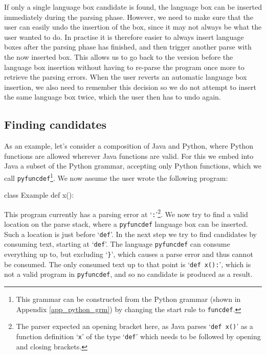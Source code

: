 \documentclass[sigplan,screen]{acmart}\settopmatter{printfolios=true,printccs=false,printacmref=false}
\newcommand{\qtt}[1]{`\texttt{#1}'\xspace}
\begin{document}
If only a single language box candidate is found, the language box
can be inserted immediately during the parsing phase. However, we need to make
sure that the user can easily undo the insertion of the box, since it may not
always be what the user wanted to do. In practise it is therefore easier to
always insert language boxes after the parsing phase has finished, and then trigger
another parse with the now inserted box. This allows us to go
back to the version before the language box insertion without having to re-parse
the program once more to retrieve the parsing errors.
When the user reverts an automatic language box insertion, we also need to remember
this decision so we do not attempt to insert the same language box twice, which the
user then has to undo again.

\subsection{Finding candidates}

As an example, let's consider a composition of Java and Python, where Python
functions are allowed wherever Java functions are valid. For this we embed into
Java a subset of the Python grammar, accepting only Python functions, which we
call \texttt{pyfuncdef}\footnote{This grammar can be constructed from the
Python grammar (shown in Appendix \ref{app_python_grm}) by changing the start
rule to \texttt{funcdef}.}. We now assume the user wrote the following program:

\begin{lstdefault}[language=Java]
  class Example {
      def x():
  }
\end{lstdefault}
\vspace{1em}

This program currently has a parsing error at \qtt{:}\footnote{The parser
expected an opening bracket here, as Java parses \qtt{def x()} as a function
definition \qtt{x} of the type \qtt{def} which needs to be followed by opening
and closing brackets.}. We now try to find a valid location on the parse stack,
where a \texttt{pyfuncdef} language box can be inserted. Such a location is just
before \qtt{def}.
In the next step we try to find candidates by consuming text, starting at
\qtt{def}.  The language \texttt{pyfuncdef} can consume everything up to, but
excluding \qtt{\}}, which causes a parse error and thus cannot be consumed. The
only consumed text up to that point is \qtt{def x():}, which is not a valid
program in \texttt{pyfuncdef}, and so no candidate is produced as a result.
\end{document}
